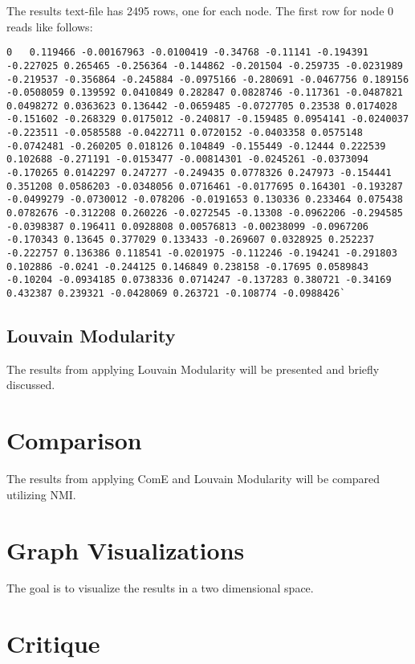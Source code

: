 \documentclass[sigconf, anonymous]{acmart}
\begin{document}
The results text-file has 2495 rows, one for each node. The first row for node 0 reads like follows:
\begin{lstlisting}
0	0.119466 -0.00167963 -0.0100419 -0.34768 -0.11141 -0.194391 -0.227025 0.265465 -0.256364 -0.144862 -0.201504 -0.259735 -0.0231989 -0.219537 -0.356864 -0.245884 -0.0975166 -0.280691 -0.0467756 0.189156 -0.0508059 0.139592 0.0410849 0.282847 0.0828746 -0.117361 -0.0487821 0.0498272 0.0363623 0.136442 -0.0659485 -0.0727705 0.23538 0.0174028 -0.151602 -0.268329 0.0175012 -0.240817 -0.159485 0.0954141 -0.0240037 -0.223511 -0.0585588 -0.0422711 0.0720152 -0.0403358 0.0575148 -0.0742481 -0.260205 0.018126 0.104849 -0.155449 -0.12444 0.222539 0.102688 -0.271191 -0.0153477 -0.00814301 -0.0245261 -0.0373094 -0.170265 0.0142297 0.247277 -0.249435 0.0778326 0.247973 -0.154441 0.351208 0.0586203 -0.0348056 0.0716461 -0.0177695 0.164301 -0.193287 -0.0499279 -0.0730012 -0.078206 -0.0191653 0.130336 0.233464 0.075438 0.0782676 -0.312208 0.260226 -0.0272545 -0.13308 -0.0962206 -0.294585 -0.0398387 0.196411 0.0928808 0.00576813 -0.00238099 -0.0967206 -0.170343 0.13645 0.377029 0.133433 -0.269607 0.0328925 0.252237 -0.222757 0.136386 0.118541 -0.0201975 -0.112246 -0.194241 -0.291803 0.102886 -0.0241 -0.244125 0.146849 0.238158 -0.17695 0.0589843 -0.10204 -0.0934185 0.0738336 0.0714247 -0.137283 0.380721 -0.34169 0.432387 0.239321 -0.0428069 0.263721 -0.108774 -0.0988426`
\end{lstlisting}

\subsection{Louvain Modularity}

The results from applying Louvain Modularity will be presented and briefly discussed.

\section{Comparison}

The results from applying ComE and Louvain Modularity will be compared utilizing NMI.

\section{Graph Visualizations}

The goal is to visualize the results in a two dimensional space.

\section{Critique}
\end{document}
